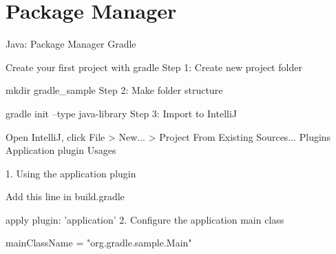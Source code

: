 \chapter{Package Manager}

Java: Package Manager
Gradle


Create your first project with gradle
Step 1: Create new project folder

mkdir gradle_sample
Step 2: Make folder structure

gradle init --type java-library
Step 3: Import to IntelliJ

Open IntelliJ, click File > New... > Project From Existing Sources...
Plugins
Application plugin
Usages

1. Using the application plugin

Add this line in build.gradle

apply plugin: 'application'
2. Configure the application main class

mainClassName = "org.gradle.sample.Main"